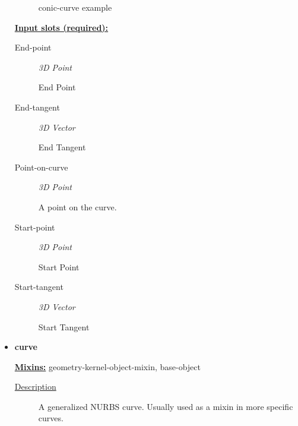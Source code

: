 \documentclass [11pt]{book}
\begin{document}
\begin{itemize}
\begin{figure}
\caption{conic-curve example}

\label{fig:conic-curve}

\end{figure}





\textbf{
\underline{Input slots (required):}}

\begin{description}

\item [End-point]
\emph{3D Point}

 End Point




\item [End-tangent]
\emph{3D Vector}

 End Tangent




\item [Point-on-curve]
\emph{3D Point}

 A point on the curve.




\item [Start-point]
\emph{3D Point}

 Start Point




\item [Start-tangent]
\emph{3D Vector}

 Start Tangent




\end{description}







\item {}
\label{prim:curve}
\textbf{curve}


\textbf{
\underline{Mixins:}} geometry-kernel-object-mixin, base-object





\begin{description}

\item [
\underline{Description}]


A generalized NURBS curve. Usually used as a mixin in more specific curves.




\end{description}
\end{itemize}
\end{document}
